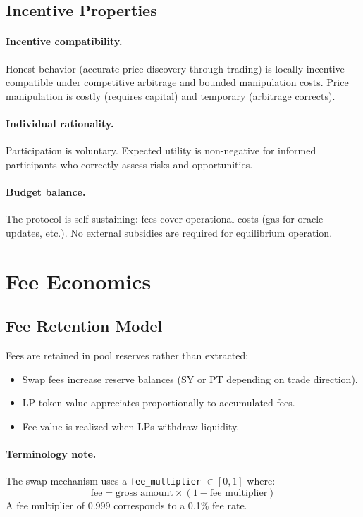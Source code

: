 \subsection{Incentive Properties}

\paragraph{Incentive compatibility.}
Honest behavior (accurate price discovery through trading) is locally incentive-compatible under competitive arbitrage and bounded manipulation costs. Price manipulation is costly (requires capital) and temporary (arbitrage corrects).

\paragraph{Individual rationality.}
Participation is voluntary. Expected utility is non-negative for informed participants who correctly assess risks and opportunities.

\paragraph{Budget balance.}
The protocol is self-sustaining: fees cover operational costs (gas for oracle updates, etc.). No external subsidies are required for equilibrium operation.

\section{Fee Economics}

\subsection{Fee Retention Model}

Fees are retained in pool reserves rather than extracted:
\begin{itemize}
\item Swap fees increase reserve balances (SY or PT depending on trade direction).
\item LP token value appreciates proportionally to accumulated fees.
\item Fee value is realized when LPs withdraw liquidity.
\end{itemize}

\paragraph{Terminology note.} The swap mechanism uses a \texttt{fee\_multiplier} $\in [0,1]$ where:
\[
\text{fee} = \text{gross\_amount} \times (1 - \text{fee\_multiplier})
\]
A fee multiplier of 0.999 corresponds to a 0.1\% fee rate.

